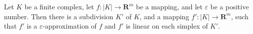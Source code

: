 Let $K$ be a finite complex, let $f: |K| \to \mathbf{R}^m$ be a mapping, and let $\varepsilon$ be a positive number. Then there is a subdivision $K'$ of $K$, and a mapping $f': |K| \to \mathbf{R}^m$, such that $f'$ is a $\varepsilon$-approximation of $f$ and $f'$ is linear on each simplex of $K'$.
